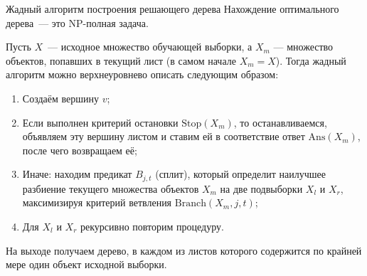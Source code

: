 \documentclass[notheorems, handout]{beamer}
\begin{document}
\begin{frame}{Жадный алгоритм построения решающего дерева}
Нахождение оптимального дерева~--- это NP-полная задача.

Пусть $X$~--- исходное множество обучающей выборки, а $X _m$ — множество объектов, попавших в текущий лист (в самом начале $X _m = X$). Тогда жадный алгоритм можно верхнеуровнево описать следующим образом:

\begin{enumerate}
	\item Создаём вершину $v$;
	\item Если выполнен критерий остановки $\mathrm{Stop}(X _m)$, то останавливаемся, объявляем эту вершину листом и ставим ей в соответствие ответ $\mathrm{Ans}(X _m)$, после чего возвращаем её;
	\item Иначе: находим предикат $B _{j, t}$ (сплит), который определит наилучшее разбиение текущего множества объектов $X _m$ на две подвыборки $X _l$ и $X _r$, максимизируя критерий ветвления $\mathrm{Branch}(X _m, j, t)$;
	\item Для $X _l$ и $X _r$ рекурсивно повторим процедуру.
\end{enumerate}

На выходе получаем дерево, в каждом из листов которого содержится по крайней мере один объект исходной выборки. 
\end{frame}
\end{document}

